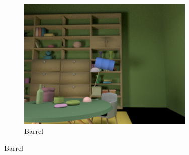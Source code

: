 \documentclass{jov}
\begin{document}
\begin{figure}[h]
    ~ %
    \begin{subfigure}[b]{0.22 \textwidth}
        \includegraphics[width=\textwidth]{Figure12/libraryWithBarrel.png}
        \caption{Barrel}
        \label{fig:libraryWithBarrel}
    \end{subfigure}
    

\end{figure}
\end{document}
